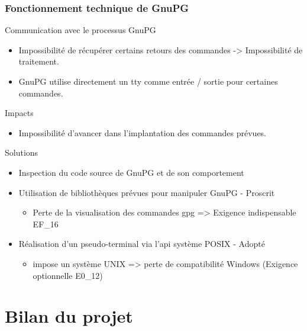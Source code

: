     \begin{frame}
      \frametitle{\color{white}Fonctionnement technique de GnuPG}
      \begin{block}{Communication avec le processus GnuPG}
        \begin{itemize}
	         \item Impossibilité de récupérer certains retours des commandes -> Impossibilité de traitement.
          \item GnuPG utilise directement un tty comme entrée / sortie pour certaines commandes.
        \end{itemize}
      \end{block}
      \pause
      \begin{alertblock}{Impacts}
        \begin{itemize}
          \item Impossibilité d'avancer dans l'implantation des commandes prévues.
        \end{itemize}
      \end{alertblock}
      \pause
      \begin{exampleblock}{Solutions}
        \begin{itemize}
          \item Inspection du code source de GnuPG et de son comportement
          \item Utilisation de bibliothèques prévues pour manipuler GnuPG - {\color{red}Proscrit}
	    \begin{itemize}
	     \item Perte de la visualisation des commandes gpg => Exigence indispensable EF\_16
	    \end{itemize}
          \item Réalisation d'un pseudo-terminal via l'api système POSIX - {\color{green}Adopté}
	    \begin{itemize}
	     \item impose un système UNIX => perte de compatibilité Windows (Exigence optionnelle E0\_12)
	    \end{itemize}
        \end{itemize}
      \end{exampleblock}
    \end{frame}

\section{Bilan du projet}
  
